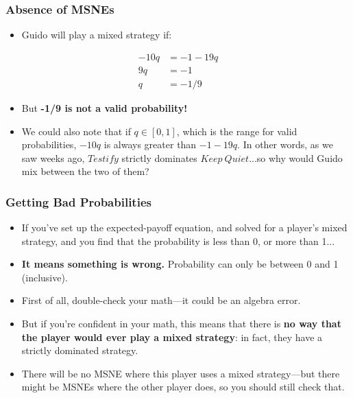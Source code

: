 
\begin{frame}
\frametitle{Absence of MSNEs}
\begin{itemize}
\item Guido will play a mixed strategy if:
\end{itemize}
\begin{align*}
-10q &= -1 - 19q\\
9q &= -1\\
q &= -1/9
\end{align*}
\begin{itemize}
  \item But \textbf{-1/9 is not a valid probability!}
\item We could also note that if $q\in [0, 1]$, which is the range for valid probabilities, $-10q$ is always greater than $-1 - 19q$. In other words, as we saw weeks ago, $Testify$ strictly dominates $Keep~Quiet$...so why would Guido mix between the two of them?
\end{itemize}
\end{frame}


\begin{frame}
\frametitle{Getting Bad Probabilities}
\begin{itemize}
	\item If you've set up the expected-payoff equation, and solved for a player's mixed strategy, and you find that the probability is less than 0, or more than 1...
	\item \textbf{It means something is wrong.} Probability can only be between 0 and 1 (inclusive).
	\item First of all, double-check your math---it could be an algebra error.
	\item But if you're confident in your math, this means that there is \textbf{no way that the player would ever play a mixed strategy}: in fact, they have a strictly dominated strategy.
	\item There will be no MSNE where this player uses a mixed strategy---but there might be MSNEs where the other player does, so you should still check that.
\end{itemize}
\end{frame}


